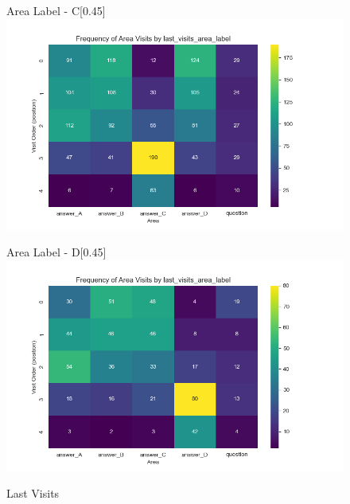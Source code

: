 \documentclass{article}
\begin{document}
\begin{figure}[H]
  \begin{subcaptionbox}{Area Label - C\label{fig:al_c}}[0.45\textwidth]
    {\centering\includegraphics[width=\linewidth]{plots/visits/matrix_first_visits_last_visits_area_label_gatherers_C (hunters).png}}
  \end{subcaptionbox}
  \hfill
  \begin{subcaptionbox}{Area Label - D\label{fig:al_d}}[0.45\textwidth]
    {\centering\includegraphics[width=\linewidth]{plots/visits/matrix_first_visits_last_visits_area_label_gatherers_D (hunters).png}}
  \end{subcaptionbox}
  
  \caption{Last Visits}
  \label{fig:fourimages3}
\end{figure}
\end{document}

